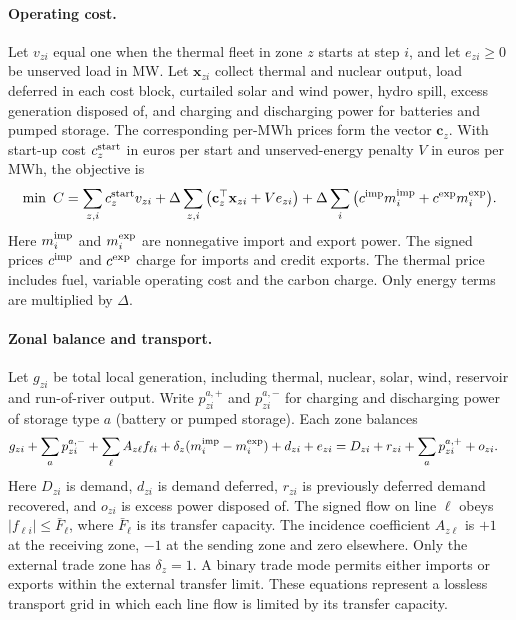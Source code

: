 \documentclass[11pt,a4paper]{article}
\begin{document}
\paragraph{Operating cost.}
Let \(v_{zi}\) equal one when the thermal fleet in zone \(z\) starts at step \(i\), and let \(e_{zi}\geq0\) be unserved load in MW. Let \(\mathbf{x}_{zi}\) collect thermal and nuclear output, load deferred in each cost block, curtailed solar and wind power, hydro spill, excess generation disposed of, and charging and discharging power for batteries and pumped storage. The corresponding per-MWh prices form the vector \(\mathbf{c}_z\). With start-up cost \(c_z^{\rm start}\) in euros per start and unserved-energy penalty \(V\) in euros per MWh, the objective is
\begin{equation}
 \min\ C =
 \sum_{z,i}c_z^{\rm start}v_{zi}
 +\Delta\sum_{z,i}\big(\mathbf{c}_z^\top\mathbf{x}_{zi}+V e_{zi}\big)
 +\Delta\sum_i\big(c^{\rm imp}m_i^{\rm imp}+c^{\rm exp}m_i^{\rm exp}\big).
 \label{eq:dispatch-cost}
\end{equation}
Here \(m_i^{\rm imp}\) and \(m_i^{\rm exp}\) are nonnegative import and export power. The signed prices \(c^{\rm imp}\) and \(c^{\rm exp}\) charge for imports and credit exports. The thermal price includes fuel, variable operating cost and the carbon charge. Only energy terms are multiplied by \(\Delta\).

\paragraph{Zonal balance and transport.}
Let \(g_{zi}\) be total local generation, including thermal, nuclear, solar, wind, reservoir and run-of-river output. Write \(p_{zi}^{a,+}\) and \(p_{zi}^{a,-}\) for charging and discharging power of storage type \(a\) (battery or pumped storage). Each zone balances
\begin{align}
 g_{zi}+\sum_a p_{zi}^{a,-}+\sum_\ell A_{z\ell}f_{\ell i}
 +\delta_z(m_i^{\rm imp}-m_i^{\rm exp})+d_{zi}+e_{zi}
 &=D_{zi}+r_{zi}+\sum_a p_{zi}^{a,+}+o_{zi}.
 \label{eq:dispatch-balance}
\end{align}
Here \(D_{zi}\) is demand, \(d_{zi}\) is demand deferred, \(r_{zi}\) is previously deferred demand recovered, and \(o_{zi}\) is excess power disposed of. The signed flow on line \(\ell\) obeys \(|f_{\ell i}|\leq\bar F_\ell\), where \(\bar F_\ell\) is its transfer capacity. The incidence coefficient \(A_{z\ell}\) is \(+1\) at the receiving zone, \(-1\) at the sending zone and zero elsewhere. Only the external trade zone has \(\delta_z=1\). A binary trade mode permits either imports or exports within the external transfer limit. These equations represent a lossless transport grid in which each line flow is limited by its transfer capacity.
\end{document}
